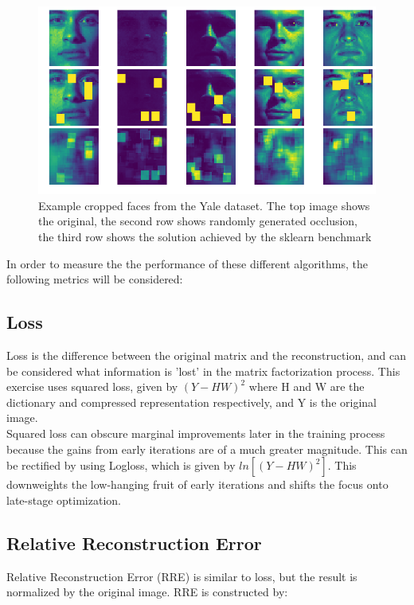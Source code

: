 \documentclass{article} %
\begin{document}
\begin{figure}[h]
  \includegraphics[width=\textwidth]{sklearn_yaleb_occluded_learn}
  \caption{Example cropped faces from the Yale dataset. The top image shows the original, the second row shows randomly generated occlusion, the third row shows the solution achieved by the sklearn benchmark}
  \label{fig:exampleyfaces}
\end{figure}


In order to measure the the performance of these different algorithms, the following metrics will be considered:\\

\subsection{Loss}
Loss is the difference between the original matrix and the reconstruction, and can be considered what information is 'lost' in the matrix factorization process. This exercise uses squared loss, given by \((Y - HW)^2\) where H and W are the dictionary and compressed representation respectively, and Y is the original image.\\

Squared loss can obscure marginal improvements later in the training process because the gains from early iterations are of a much greater magnitude. This can be rectified by using Logloss, which is given by \(ln[ (Y - HW)^2 ]\). This downweights the low-hanging fruit of early iterations and shifts the focus onto late-stage optimization.\\

\subsection{Relative Reconstruction Error}
Relative Reconstruction Error (RRE) is similar to loss, but the result is normalized by the original image. RRE is constructed by:
\end{document}
